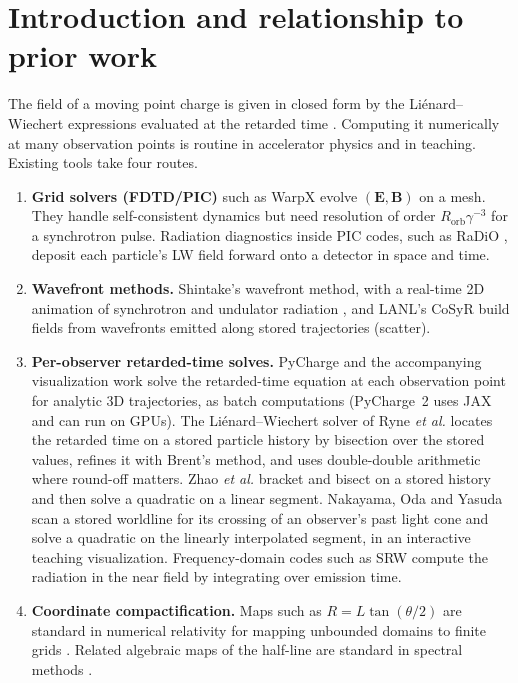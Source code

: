 \documentclass[11pt, a4paper]{article}
\begin{document}
\section{Introduction and relationship to prior work}

The field of a moving point charge is given in closed form by the Li\'enard--Wiechert expressions evaluated at the retarded time \cite{jackson1999}. Computing it numerically at many observation points is routine in accelerator physics and in teaching. Existing tools take four routes.
\begin{enumerate}
    \item \textbf{Grid solvers (FDTD/PIC)} such as WarpX \cite{vay2018} evolve $(\mathbf{E}, \mathbf{B})$ on a mesh. They handle self-consistent dynamics but need resolution of order $R_{\text{orb}}\gamma^{-3}$ for a synchrotron pulse. Radiation diagnostics inside PIC codes, such as RaDiO \cite{pardal2023}, deposit each particle's LW field forward onto a detector in space and time.
    \item \textbf{Wavefront methods.} Shintake's wavefront method, with a real-time 2D animation of synchrotron and undulator radiation \cite{shintake2002linac, shintake2003}, and LANL's CoSyR \cite{huang2022} build fields from wavefronts emitted along stored trajectories (scatter).
    \item \textbf{Per-observer retarded-time solves.} PyCharge \cite{pycharge2022} and the accompanying visualization work \cite{filipovich2021} solve the retarded-time equation at each observation point for analytic 3D trajectories, as batch computations (PyCharge~2 uses JAX and can run on GPUs). The Li\'enard--Wiechert solver of Ryne \textit{et al.} \cite{ryne2013} locates the retarded time on a stored particle history by bisection over the stored values, refines it with Brent's method, and uses double-double arithmetic where round-off matters. Zhao \textit{et al.} \cite{zhao2026} bracket and bisect on a stored history and then solve a quadratic on a linear segment. Nakayama, Oda and Yasuda \cite{nakayama2025} scan a stored worldline for its crossing of an observer's past light cone and solve a quadratic on the linearly interpolated segment, in an interactive teaching visualization. Frequency-domain codes such as SRW \cite{chubar1998} compute the radiation in the near field by integrating over emission time.
    \item \textbf{Coordinate compactification.} Maps such as $R = L\tan(\theta/2)$ are standard in numerical relativity for mapping unbounded domains to finite grids \cite{zenginoglu2008}. Related algebraic maps of the half-line are standard in spectral methods \cite{boyd1987}.
\end{enumerate}
\end{document}
